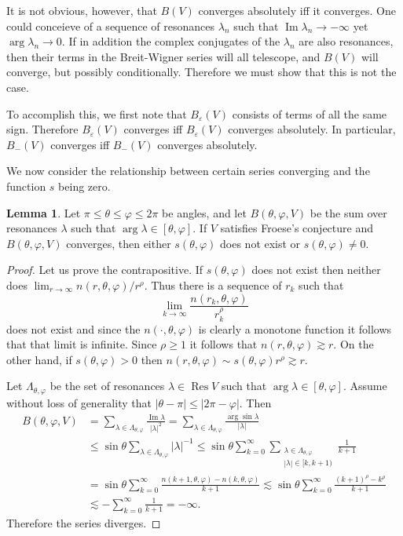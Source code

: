 \documentclass[12pt]{report}
\DeclareMathOperator{\Res}{Res}
\renewcommand{\Im}{\operatorname{Im}}
\theoremstyle{definition}
\newtheorem{lemma}[theorem]{Lemma}
\begin{document}
It is not obvious, however, that $B(V)$ converges absolutely iff it converges. One could conceieve of a sequence of resonances $\lambda_n$ such that $\Im \lambda_n \to -\infty$ yet $\arg \lambda_n \to 0$.
If in addition the complex conjugates of the $\lambda_n$ are also resonances, then their terms in the Breit-Wigner series will all telescope, and $B(V)$ will converge, but possibly conditionally.
Therefore we must show that this is not the case.

To accomplish this, we first note that $B_\varepsilon(V)$ consists of terms of all the same sign. Therefore $B_\varepsilon(V)$ converges iff $B_\varepsilon(V)$ converges absolutely. In particular, $B_-(V)$ converges iff $B_-(V)$ converges absolutely.

We now consider the relationship between certain series converging and the function $s$ being zero.
\begin{lemma}
\label{s zero iff converge}
Let $\pi \leq \theta \leq \varphi \leq 2\pi$ be angles, and let $B(\theta, \varphi, V)$ be the sum over resonances $\lambda$ such that $\arg \lambda \in [\theta, \varphi]$. If $V$ satisfies Froese's conjecture and $B(\theta, \varphi, V)$ converges, then either $s(\theta, \varphi)$ does not exist or $s(\theta, \varphi) \neq 0$.
\end{lemma}
\begin{proof}
Let us prove the contrapositive. If $s(\theta, \varphi)$ does not exist then neither does $\lim_{r \to \infty} n(r, \theta, \varphi)/r^\rho$. Thus there is a sequence of $r_k$ such that
$$\lim_{k \to \infty} \frac{n(r_k, \theta, \varphi)}{r_k^\rho}$$
does not exist and since the $n(\cdot, \theta,\varphi)$ is clearly a monotone function it follows that that limit is infinite. Since $\rho \geq 1$ it follows that $n(r, \theta, \varphi) \gtrsim r$. On the other hand, if $s(\theta, \varphi) > 0$ then $n(r, \theta, \varphi) \sim s(\theta, \varphi)r^\rho \gtrsim r$.

Let $\Lambda_{\theta,\varphi}$ be the set of resonances $\lambda \in \Res V$ such that $\arg \lambda \in [\theta, \varphi]$. Assume without loss of generality that $|\theta - \pi| \leq |2\pi - \varphi|$. Then
\begin{align*}
B(\theta, \varphi, V) &= \sum_{\lambda \in \Lambda_{\theta,\varphi}} \frac{\Im \lambda}{|\lambda|^2}
  = \sum_{\lambda \in \Lambda_{\theta,\varphi}} \frac{\arg \sin \lambda}{|\lambda|}\\
  &\leq \sin \theta \sum_{\lambda \in \Lambda_{\theta,\varphi}} |\lambda|^{-1}
  \leq \sin \theta \sum_{k=0}^\infty \sum_{\substack{\lambda \in \Lambda_{\theta,\varphi}\\|\lambda| \in [k, k+1)}} \frac{1}{k+1}\\
  &= \sin \theta \sum_{k=0}^\infty \frac{n(k+1, \theta, \varphi) - n(k, \theta, \varphi)}{k+1}
  \lesssim \sin \theta \sum_{k=0}^\infty \frac{(k+1)^\rho - k^\rho}{k+1}\\
  &\lesssim -\sum_{k=0}^\infty \frac{1}{k+1} = -\infty.
\end{align*}
Therefore the series diverges.
\end{proof}
\end{document}
